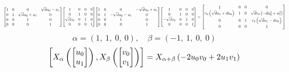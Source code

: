 \documentclass[11pt]{article}
\theoremstyle{definition}
\begin{document}
\[
\scaletoalign{\textwidth}{{\left[\begin{matrix}1 & 0 & 0 & \sqrt{d} u_{0} - u_{1}\\0 & 1 & \sqrt{d} u_{0} + u_{1} & 0\\0 & 0 & 1 & 0\\0 & 0 & 0 & 1\end{matrix}\right]} {\left[\begin{matrix}1 & 0 & 0 & 0\\0 & 1 & 0 & 0\\\sqrt{d} v_{0} & 0 & 1 & 0\\0 & 0 & 0 & 1\end{matrix}\right]} {\left[\begin{matrix}1 & 0 & 0 & - \sqrt{d} u_{0} + u_{1}\\0 & 1 & - \sqrt{d} u_{0} - u_{1} & 0\\0 & 0 & 1 & 0\\0 & 0 & 0 & 1\end{matrix}\right]} {\left[\begin{matrix}1 & 0 & 0 & 0\\0 & 1 & 0 & 0\\- \sqrt{d} v_{0} & 0 & 1 & 0\\0 & 0 & 0 & 1\end{matrix}\right]} = {\left[\begin{matrix}1 & 0 & 0 & 0\\v_{0} \left(\sqrt{d} u_{1} + d u_{0}\right) & 1 & 0 & \sqrt{d} v_{0} \left(- d u_{0}^{2} + u_{1}^{2}\right)\\0 & 0 & 1 & v_{0} \left(\sqrt{d} u_{1} - d u_{0}\right)\\0 & 0 & 0 & 1\end{matrix}\right]}}
\]
\[
\alpha = \left( 1, \  1, \  0, \  0\right), \quad \beta = \left( -1, \  1, \  0, \  0\right)
\]
\[
\scaletoalign{\textwidth}{\left[ X_{\alpha}\left(\left[\begin{matrix}u_{0}\\u_{1}\end{matrix}\right]\right), X_{\beta}\left(\left[\begin{matrix}v_{0}\\v_{1}\end{matrix}\right]\right) \right] = X_{\alpha + \beta}\left(- 2 u_{0} v_{0} + 2 u_{1} v_{1}\right)}
\]
\end{document}
